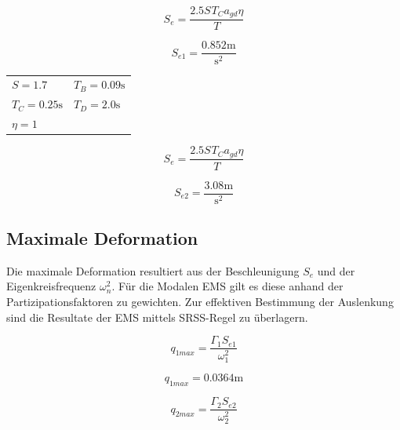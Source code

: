 \documentclass[
  letterpaper,
  DIV=11]{scrreprt}
\begin{document}
\begin{equation}S_{e} = \frac{2.5 S_{} T_{C} a_{gd} \eta}{T}\end{equation}

\begin{equation}S_{e 1} = \frac{0.852 \text{m}}{\text{s}^{2}}\end{equation}

\begin{longtable}[]{@{}
  >{\raggedright\arraybackslash}p{}
  >{\raggedright\arraybackslash}p{}@{}}
\toprule\noalign{}
\endhead
\bottomrule\noalign{}
\endlastfoot
\(S = 1.7\) & \(T_{B} = 0.09 \text{s}\) \\
\(T_{C} = 0.25 \text{s}\) & \(T_{D} = 2.0 \text{s}\) \\
\(\eta = 1\) & \\
\end{longtable}

\begin{equation}S_{e} = \frac{2.5 S_{} T_{C} a_{gd} \eta}{T}\end{equation}

\begin{equation}S_{e 2} = \frac{3.08 \text{m}}{\text{s}^{2}}\end{equation}

\hypertarget{maximale-deformation-1}{%
\subsection{Maximale Deformation}\label{maximale-deformation-1}}

Die maximale Deformation resultiert aus der Beschleunigung \(S_e\) und
der Eigenkreisfrequenz \(\omega_n^2\). Für die Modalen EMS gilt es diese
anhand der Partizipationsfaktoren zu gewichten. Zur effektiven
Bestimmung der Auslenkung sind die Resultate der EMS mittels SRSS-Regel
zu überlagern.

\begin{equation}q_{1 max} = \frac{\Gamma_{1} S_{e 1}}{\omega_{1}^{2}}\end{equation}

\begin{equation}q_{1 max} = 0.0364 \text{m}\end{equation}

\begin{equation}q_{2 max} = \frac{\Gamma_{2} S_{e 2}}{\omega_{2}^{2}}\end{equation}
\end{document}
